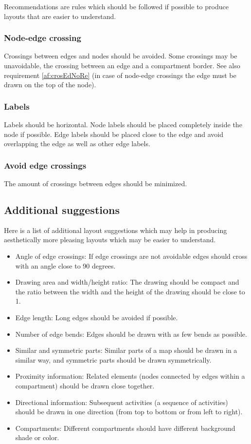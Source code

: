 Recommendations are rules which should be followed if possible to produce layouts that are easier to understand.

\subsubsection{Node-edge crossing}
\label{af:crosEdNo}

Crossings between edges and nodes should be avoided. Some crossings may be unavoidable, \eg the crossing between an edge and a compartment border. See also requirement \ref{af:crosEdNoRe} (in case of node-edge crossings the edge must be drawn on the top of the node).

\subsubsection{Labels}

Labels should be horizontal. Node labels should be placed completely inside the node if possible. Edge labels should be placed close to the edge and avoid overlapping the edge as well as other edge labels.

\subsubsection{Avoid edge crossings}

The amount of crossings between edges should be minimized.

\subsection{Additional suggestions}

Here is a list of additional layout suggestions which may help in producing aesthetically more pleasing layouts which may be easier to understand.

\begin{itemize}
  \item Angle of edge crossings: If edge crossings are not avoidable   edges should cross with an angle close to 90 degrees.
  \item Drawing area and width/height ratio: The drawing should be compact and the ratio between the width and the height of the drawing should be close to 1.
  \item Edge length: Long edges should be avoided if possible.
  \item Number of edge bends: Edges should be drawn with as few bends as possible.
  \item Similar and symmetric parts: Similar parts of a map should be drawn in a similar way, and symmetric parts should be drawn symmetrically.
  \item Proximity information: Related elements (\eg nodes connected by edges within a compartment) should be drawn close together.
  \item Directional information: Subsequent activities (\eg a sequence of activities) should be drawn in one direction (\eg from top to bottom or from left to right).
  \item Compartments: Different compartments should have different background shade or color.
\end{itemize}